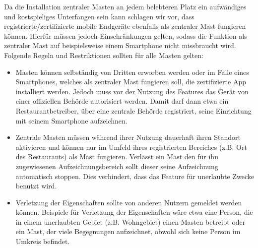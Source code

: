 \documentclass[conference,compsoc]{IEEEtran}
\begin{document}
Da die Installation zentraler Masten an jedem belebteren Platz ein aufwändiges und kostspieliges Unterfangen sein kann schlagen wir vor, dass registrierte/zertifizierte mobile Endgeräte ebenfalls als zentraler Mast fungieren können. 
Hierfür müssen jedoch Einschränkungen gelten, sodass die Funktion als zentraler Mast auf beispielsweise einem Smartphone nicht missbraucht wird.
Folgende Regeln und Restriktionen sollten für alle Masten gelten:
\begin{itemize}
	\item Masten können selbständig von Dritten erworben werden oder im Falle eines Smartphones, welches als zentraler Mast fungieren soll, die zertifizierte App installiert werden.
	Jedoch muss vor der Nutzung des Features das Gerät von einer offiziellen Behörde autorisiert werden. Damit darf dann etwa ein Restaurantbetreiber, über eine zentrale Behörde registriert, seine Einrichtung mit seinem Smartphone aufzeichnen. 
	\item Zentrale Masten müssen während ihrer Nutzung dauerhaft ihren Standort aktivieren und können nur im Umfeld ihres registrierten Bereiches (z.B. Ort des Restaurants) als Mast fungieren. 
	Verlässt ein Mast den für ihn zugewiesenen Aufzeichnungsbereich sollt dieser seine Aufzeichnung automatisch stoppen. Dies verhindert, dass das Feature für unerlaubte Zwecke benutzt wird.
	\item Verletzung der Eigenschaften sollte von anderen Nutzern gemeldet werden können. 
	Beispiele für Verletzung der Eigenschaften wäre etwa eine Person, die in einem unerlaubten Gebiet (z.B. Wohngebiet) einen Masten betreibt oder ein Mast, der viele Begegnungen aufzeichnet, obwohl sich keine Person im Umkreis befindet.  
\end{itemize}
\end{document}

